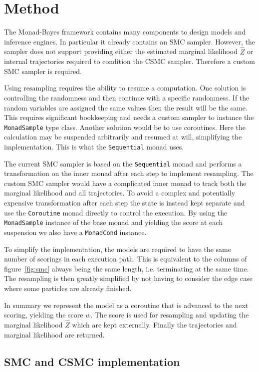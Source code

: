 \section{Method}

The Monad-Bayes framework contains many components to design models and inference engines.
In particular it already contains an SMC sampler.
However, the sampler does not support providing either the estimated marginal likelihood $\hat Z$ or internal trajectories required to condition the CSMC sampler.
Therefore a custom SMC sampler is required.

Using resampling requires the ability to resume a computation.
One solution is  controlling the randomness and then continue with a specific randomness.
If the random variables are assigned the same values then the result will be the same.
This requires significant bookkeeping and needs a custom sampler to instance the \texttt{MonadSample} type class.
Another solution would be to use coroutines.
Here the calculation may be suspended arbitrarily and resumed at will, simplifying the implementation.
This is what the \texttt{Sequential} monad uses.

The current SMC sampler is based on the \texttt{Sequential} monad and performs a transformation on the inner monad after each step to implement resampling.
The custom SMC sampler would have a complicated inner monad to track both the marginal likelihood and all trajectories.
To avoid a complex and potentially expensive transformation after each step the state is instead kept separate and use the \texttt{Coroutine} monad directly to control the execution.
By using the \texttt{MonadSample} instance of the base monad and yielding the score at each suspension we also have a \texttt{MonadCond} instance.

To simplify the implementation, the models are required to have the same number of scorings in each execution path. This is equivalent to the columns of figure~\ref{fig:smc} always being the same length, i.e. terminating at the same time. The resampling is then greatly simplified by not having to consider the edge case where some particles are already finished.

In summary we represent the model as a coroutine that is advanced to the next scoring, yielding the score $w$. The score is used for resampling and updating the marginal likelihood $\hat Z$ which are kept externally. Finally the trajectories and marginal likelihood are returned.

\subsection{SMC and CSMC implementation}


